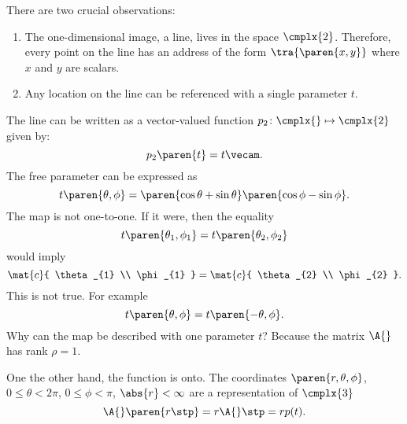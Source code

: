 There are two crucial observations:
\begin{enumerate}
%
\item The one-dimensional image, a line, lives in the space $\cmplx{2}$. Therefore, every point on the line has an address of the form $\tra{\paren{x,y}}$ where $x$ and $y$ are scalars.
%
\item Any location on the line can be referenced with a single parameter $t$. 
%
\end{enumerate}
The line can be written as a vector-valued function $p_{2}\colon \cmplx{} \mapsto \cmplx{2}$ given by:
\begin{equation}
   p_{2}\paren{ t } = t \vecam.
\end{equation}
The free parameter can be expressed as
\begin{equation}
  t\paren{ \theta, \phi } = \paren{ \cos \theta + \sin \theta } \paren{ \cos \phi   - \sin \phi } .
\end{equation}
The map is not one-to-one. If it were, then the equality
\begin{equation}
  t\paren{ \theta_{1}, \phi_{1} } = t\paren{ \theta_{2}, \phi_{2} }
\end{equation}
would imply
\begin{equation}
  \mat{c}{ \theta_{1} \\ \phi_{1} } = \mat{c}{ \theta_{2} \\ \phi_{2} }.
\end{equation}
This is not true. For example
\begin{equation}
  t\paren{ \theta, \phi } = t\paren{ -\theta, \phi } .
\end{equation}
Why can the map be described with one parameter $t$? Because the matrix $\A{}$ has rank $\rho = 1$.

One the other hand, the function is onto. The coordinates $\paren{r,\theta,\phi}$, $0 \le \theta < 2\pi$, $0 \le \phi < \pi$, $\abs{r} < \infty$ are a representation of $\cmplx{3}$
\begin{equation}
  \A{} \paren{ r \stp } = r \A{} \stp = r p(t).
\end{equation}

